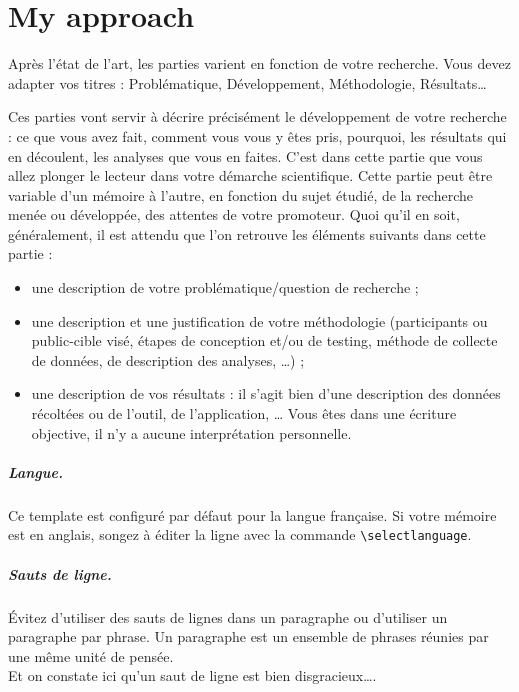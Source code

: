 \chapter{My approach}
\label{chap:approach}


Après l'état de l'art, les parties varient en fonction de votre
recherche. Vous devez adapter vos titres : Problématique,
Développement, Méthodologie, Résultats\ldots


Ces parties vont servir à décrire précisément le développement de
votre recherche : ce que vous avez fait, comment vous vous y êtes
pris, pourquoi, les résultats qui en découlent, les analyses que vous
en faites. C'est dans cette partie que vous allez plonger le lecteur
dans votre démarche scientifique. Cette partie peut être variable d'un
mémoire à l'autre, en fonction du sujet étudié, de la recherche menée
ou développée, des attentes de votre promoteur. Quoi qu'il en soit,
généralement, il est attendu que l'on retrouve les éléments suivants
dans cette partie :

\begin{itemize}
\item[\textbullet] une description de votre problématique/question de
  recherche ;
\item[\textbullet] une description et une justification de votre
  méthodologie (participants ou public-cible visé, étapes de
  conception et/ou de testing, méthode de collecte de données, de
  description des analyses, …) ;
\item[\textbullet] une description de vos résultats : il s'agit bien
  d'une description des données récoltées ou de l'outil, de
  l'application, … Vous êtes dans une écriture objective, il n'y a
  aucune interprétation personnelle.
\end{itemize}


\paragraph{Langue.} Ce template est configuré par défaut pour la
langue française. Si votre mémoire est en anglais, songez à éditer la
ligne avec la commande \texttt{\textbackslash selectlanguage}.

\paragraph{Sauts de ligne.}
\'Evitez d'utiliser des sauts de lignes dans un paragraphe ou
d'utiliser un paragraphe par phrase. Un paragraphe est un ensemble de
phrases réunies par une même unité de pensée.\\ Et on constate ici
qu'un saut de ligne est bien disgracieux\dots.

